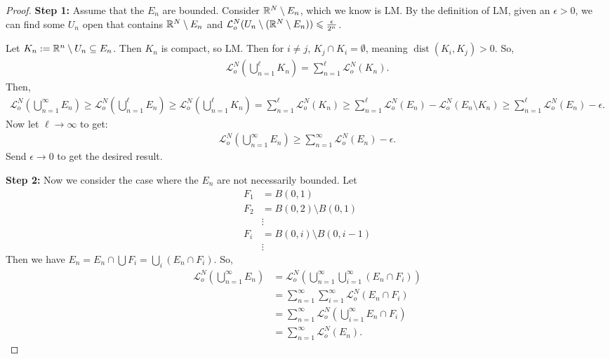 \documentclass{report}
\DeclareMathOperator{\dist}{dist}
\begin{document}
\begin{proof}
    \textbf{Step 1:} Assume that the $E_n$ are bounded. Consider $\RR^N \setminus E_n$, which we know is LM. By the definition of LM, given an $\epsilon > 0$, we can find some $U_n$ open that contains $\RR^N \setminus E_n$ and $\mathcal L_o^N(U_n \setminus (\RR^N \setminus E_n)) \leq \frac{\epsilon}{2^n}$. 

    Let $K_n := \RR^n \setminus U_n \subseteq E_n$. Then $K_n$ is compact, so LM. Then for $i \neq j$, $K_j \cap K_i = \emptyset$, meaning $\dist (K_i, K_j) > 0$. So, 
    \begin{align*}
        \mathcal L_o^N\left(\bigcup_{n=1}^\ell K_n\right) = \sum_{n=1}^\ell \mathcal L_o^N(K_n).
    \end{align*}
    Then,
    \begin{align*}
        \mathcal L_o^N\left(\bigcup_{n=1}^\infty E_n\right) \geq \mathcal L_o^N\left(\bigcup_{n=1}^\ell E_n\right) \geq \mathcal L_o^N\left(\bigcup_{n=1}^\ell K_n\right) = \sum_{n=1}^\ell \mathcal L_o^N(K_n) \geq \sum_{n=1}^\ell \mathcal L_o^N(E_n) - \mathcal L_o^N(E_n \setminus K_n) \geq \sum_{n=1}^\ell \mathcal L_o^N(E_n) - \epsilon.
    \end{align*}
    Now let $\ell \to \infty$ to get:
    \begin{align*}
        \mathcal L_o^N\left(\bigcup_{n=1}^\infty E_n\right) \geq \sum_{n = 1}^\infty \mathcal L_o^N ( E_n) - \epsilon.
    \end{align*}
    Send $\epsilon \to 0$ to get the desired result.

    \textbf{Step 2:} Now we consider the case where the $E_n$ are not necessarily bounded. Let 
    \begin{align*}
        F_1 &= B(0, 1) \\
        F_2 &= B(0, 2) \setminus B(0, 1) \\
        &\vdots \\
        F_i &= B(0, i) \setminus B(0, i-1) \\
        &\vdots
    \end{align*}
    Then we have $E_n = E_n \cap \bigcup F_i = \bigcup_i (E_n \cap F_i)$. So,
    \begin{align*}
        \mathcal L_o^N \left(\bigcup_{n=1}^\infty E_n \right) &= \mathcal L_o^N \left( \bigcup_{n=1}^\infty \bigcup_{i=1}^\infty (E_n \cap F_i)\right) \\
        &= \sum_{n=1}^\infty \sum_{i=1}^\infty \mathcal L_o^N (E_n \cap F_i) \\
        &= \sum_{n=1}^\infty \mathcal L_o^N\left( \bigcup_{i=1}^\infty E_n \cap F_i\right) \\
        &= \sum_{n=1}^\infty \mathcal L_o^N(E_n).
    \end{align*}
\end{proof}
\end{document}
